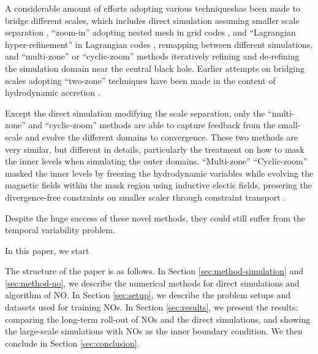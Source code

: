 \documentclass{article}
\newcommand{\hywcom}[1]{{\color{purple}{[HYW: #1]}}}
\begin{document}
\hywcom{Black hole feeding and feedback problem.}
\hywcom{And Computational advances.}
A considerable amount of efforts adopting various techniqueshas been made to bridge different scales, 
which includes direct simulation assuming smaller scale separation \cite{Lalakos:2022qhl,Lalakos:2023ean,S:2023gta,Lalakos:2025msz},
``zoom-in'' adopting nested mesh in grid codes \cite{Guo2023,Guo2024}, and ``Lagrangian hyper-refinement'' in Lagrangian codes \cite{Hopkins:2023ipv,Hopkins2023},
remapping between different simulations, 
and ``multi-zone'' \cite{Cho:2023wqr,Cho:2024wsp,Cho:2025lzq} or ``cyclic-zoom'' \cite{Guo:2025sjb} methods iteratively 
refining and de-refining the simulation domain near the central black hole.
Earlier attempts on bridging scales adopting ``two-zone'' techniques have been made in the content of hydrodynamic accretion  \cite{Yuan:2012ApJ...761..129Y}.


\hywcom{Spatial-Temporal multiscale variability problem.}
Except the direct simulation modifying the scale separation, only the ``multi-zone'' and ``cyclic-zoom'' methods are able to capture feedback from the small-scale and evolve the different domains to convergence.
These two methods are very similar, but different in details, particularly the treatment on how to mask the inner levels when simulating the outer domains. 
``Multi-zone''
``Cyclic-zoom'' masked the inner levels by freezing the hydrodynamic variables while evolving the magnetic fields within the mask region using inductive electic fields, presering the divergence-free constraints on smaller scaler through constraint transport \cite{Balsara:1999JCoPh.149..270B,Gardiner2008}.

\hywcom{Temporal variability hierarchy.}
Despite the huge success of these novel methods, they could still suffer from the temporal variability problem.

\hywcom{Neural Operator}
In this paper, we start 

\hywcom{Paper Structure.}
The structure of the paper is as follows. 
\hywcom{multiscal-NO?}
In Section \ref{sec:method-simulation} and \ref{sec:method-no}, we describe the numerical methods for direct simulations and algorithm of NO.
In Section \ref{sec:setup}, we describe the problem setups and datasets used for training NOs.
In Section \ref{sec:results}, we present the results: comparing the long-term roll-out of NOs and the direct simulations, and showing the large-scale simulations with NOs as the inner boundary condition.
We then conclude in Section \ref{sec:conclusion}.
\end{document}
